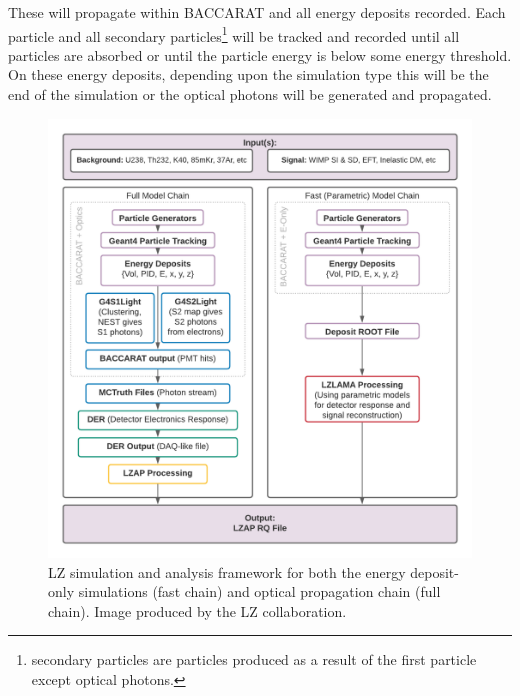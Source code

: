 These will propagate within BACCARAT and all energy deposits recorded.
Each particle and all secondary particles\footnote{secondary particles are particles produced as a result of the first particle except optical photons.} will be tracked and recorded until all particles are absorbed or until the particle energy is below some energy threshold.
On these energy deposits, depending upon the simulation type this will be the end of the simulation or the optical photons will be generated and propagated.
\begin{figure}
    \centering
    \includegraphics[width=15cm]{Figures/LZ/FullAndFastChains.png}
    \caption{LZ simulation and analysis framework for both the energy deposit-only simulations (fast chain) and optical propagation chain (full chain).
             Image produced by the LZ collaboration.}
    \label{fig:lz_simulation_chain}
\end{figure}








